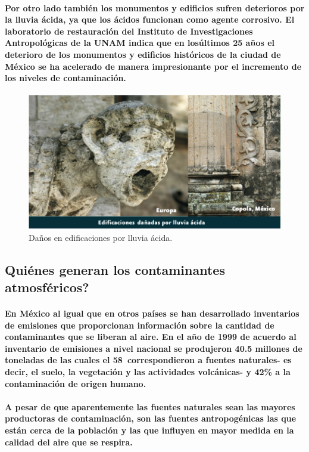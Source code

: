     \paragraph {Por otro lado también los monumentos y edificios sufren deterioros por la lluvia ácida, ya que los ácidos funcionan como agente corrosivo. El laboratorio de restauración del Instituto de Investigaciones Antropológicas de la UNAM indica que en losúltimos 25 años el deterioro de los monumentos y edificios históricos de la ciudad de México se ha acelerado de manera impresionante por el incremento de los niveles de contaminación.}

	\begin{figure}[h!]
	  	\centering
  	      \includegraphics[width=\textwidth]{./images/3.png}
  	    \caption{Daños en edificaciones por lluvia ácida.}
	\end{figure}

    \subsection {Quiénes generan los contaminantes atmosféricos?}
    \paragraph {En México al igual que  en otros países se han desarrollado inventarios de emisiones que proporcionan información sobre la cantidad de contaminantes que se liberan al aire. En el año de 1999 de acuerdo al inventario de emisiones a nivel nacional se produjeron 40.5 millones de toneladas de las cuales el 58\ correspondieron a fuentes naturales- es decir, el suelo, la vegetación y las actividades volcánicas-    y 42\% a la contaminación de origen humano.}

    \paragraph {A pesar de que aparentemente las fuentes naturales sean las mayores productoras de contaminación, son las fuentes antropogénicas las que están cerca de la población y las que influyen en mayor medida en la calidad del aire que se respira.}

